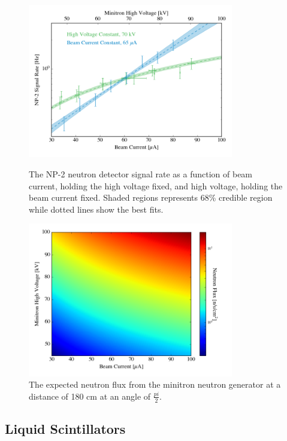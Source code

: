 \begin{figure}[p]
	\centering
	\includegraphics[width=0.8\textwidth]{nerix_minitron_fits}
	\caption{The NP-2 neutron detector signal rate as a function of beam current, holding the high voltage fixed, and high voltage, holding the beam current fixed.  Shaded regions represents 68\% credible region while dotted lines show the best fits.}
	\label{fig:nerix_minitron_fits}

        \vspace{\floatsep}

	\centering
	\includegraphics[width=0.8\textwidth]{nerix_minitron_rate}
	\caption{The expected neutron flux from the minitron neutron generator at a distance of 180 cm at an angle of $\frac{pi}{2}$.}
	\label{fig:nerix_minitron_rate}
\end{figure}



\subsection{Liquid Scintillators}

